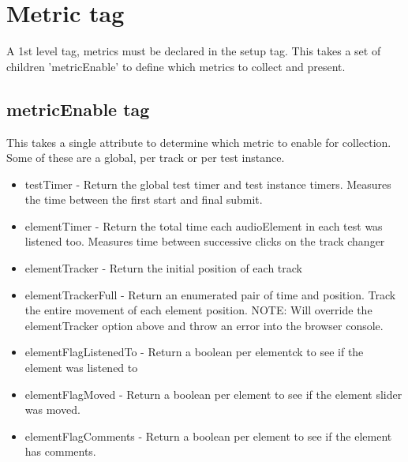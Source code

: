 \documentclass{article}
\begin{document}
\section{Metric tag}
A 1st level tag, metrics must be declared in the setup tag. This takes a set of children 'metricEnable' to define which metrics to collect and present.

\subsection{metricEnable tag}
This takes a single attribute to determine which metric to enable for collection. Some of these are a global, per track or per test instance.
\begin{itemize}
\item testTimer - Return the global test timer and test instance timers. Measures the time between the first start and final submit.
\item elementTimer - Return the total time each audioElement in each test was listened too. Measures time between successive clicks on the track changer
\item elementTracker - Return the initial position of each track
\item elementTrackerFull - Return an enumerated pair of time and position. Track the entire movement of each element position. NOTE: Will override the elementTracker option above and throw an error into the browser console.
\item elementFlagListenedTo - Return a boolean per elementck to see if the element was listened to
\item elementFlagMoved - Return a boolean per element to see if the element slider was moved.
\item elementFlagComments - Return a boolean per element to see if the element has comments.
\end{itemize}
\end{document}
